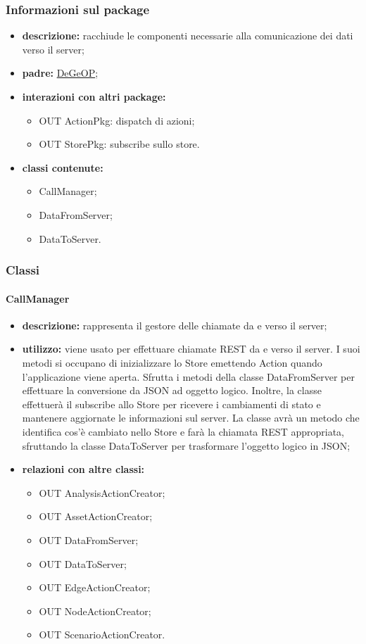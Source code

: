 \subsubsection{Informazioni sul package}
\begin{itemize}
	\item \textbf{descrizione:} racchiude le componenti necessarie alla comunicazione dei dati verso il server;
	\item \textbf{padre:} \hyperref[pkg::DeGeOP]{DeGeOP};
	\item \textbf{interazioni con altri package:} 
	\begin{itemize}
		\item OUT ActionPkg: dispatch di azioni;
		\item OUT StorePkg: subscribe sullo store.
	\end{itemize}
	\item \textbf{classi contenute:}
	\begin{itemize}
		\item CallManager;
		\item DataFromServer;
		\item DataToServer.
	\end{itemize}
\end{itemize}
\subsubsection{Classi}
\paragraph{CallManager}
\begin{itemize}
	\item \textbf{descrizione:} rappresenta il gestore delle chiamate da e verso il server;
	\item \textbf{utilizzo:} viene usato per effettuare chiamate REST da e verso il server. I suoi metodi si occupano di inizializzare lo Store emettendo Action quando l'applicazione viene aperta. Sfrutta i metodi della classe DataFromServer per effettuare la conversione da JSON ad oggetto logico. Inoltre, la classe effettuerà il subscribe allo Store per ricevere i cambiamenti di stato e mantenere aggiornate le informazioni sul server. La classe avrà un metodo che identifica cos'è cambiato nello Store e farà la chiamata REST appropriata, sfruttando la classe DataToServer per trasformare l'oggetto logico in JSON;
	\item \textbf{relazioni con altre classi:} 
	\begin{itemize}
		\item OUT AnalysisActionCreator;
		\item OUT AssetActionCreator;
		\item OUT DataFromServer;
		\item OUT DataToServer;
		\item OUT EdgeActionCreator;
		\item OUT NodeActionCreator;
		\item OUT ScenarioActionCreator.
	\end{itemize}
\end{itemize}
